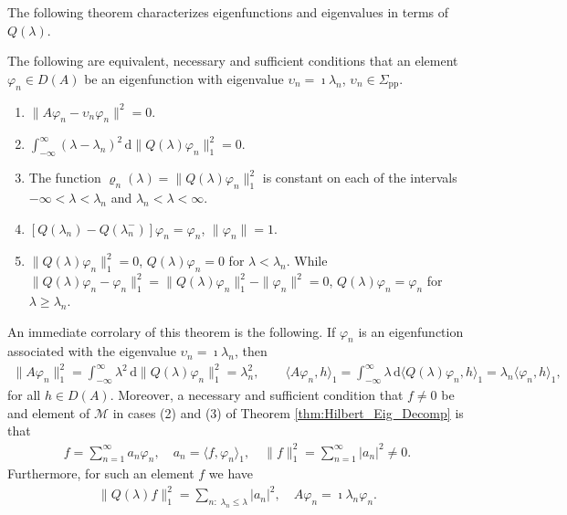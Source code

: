 \documentclass[leqno,onefignum,onetabnum]{siamltex1213}
\renewcommand{\d}{\mathrm{d}}
\newcommand{\Sigp}{\Sigma_{\text{pp}}}
\newcommand{\Mc}{\mathcal{M}}
\begin{document}
The following theorem characterizes eigenfunctions and eigenvalues in
terms of $Q(\lambda)$.
%
\begin{theorem}\label{thm:Eig_fun_val}
The following are equivalent, necessary and sufficient conditions that
an element $\varphi_n\in D(A)$ be an eigenfunction with eigenvalue $\upsilon_n=\imath\lambda_n$,
$\upsilon_n\in\Sigp$. 
%
\begin{enumerate}
\item $\|A\varphi_n-\upsilon_n\varphi_n\|^2=0$.
\item $\int_{-\infty}^\infty(\lambda-\lambda_n)^2\,\d\|Q(\lambda)\varphi_n\|_1^2=0$.
\item The function $\varrho_n(\lambda)=\|Q(\lambda)\varphi_n\|_1^2$ is constant on each of the
  intervals $-\infty<\lambda<\lambda_n$ and $\lambda_n<\lambda<\infty$.
\item $[Q(\lambda_n)-Q(\lambda_n^-)]\varphi_n=\varphi_n$, $\|\varphi_n\|=1$.
\item $\|Q(\lambda)\varphi_n\|_1^2=0$, $Q(\lambda)\varphi_n=0$ for $\lambda<\lambda_n$. While
      $\|Q(\lambda)\varphi_n-\varphi_n\|_1^2=\|Q(\lambda)\varphi_n\|_1^2-\|\varphi_n\|^2=0$, $Q(\lambda)\varphi_n=\varphi_n$ for $\lambda\geq\lambda_n$. 
\end{enumerate}
%
\end{theorem}
%
\noindent
An immediate corrolary of this theorem is the following. If $\varphi_n$ is
an eigenfunction associated with the eigenvalue $\upsilon_n=\imath\lambda_n$, then
\cite{Stone:64}   
%
\begin{align}
  \|A\varphi_n\|_1^2=\int_{-\infty}^\infty\lambda^2\,\d\|Q(\lambda)\varphi_n\|_1^2=\lambda_n^2, \qquad
  \langle A\varphi_n,h\rangle_1=\int_{-\infty}^\infty\lambda\,\d\langle Q(\lambda)\varphi_n,h\rangle_1=\lambda_n\langle\varphi_n,h\rangle_1,
\end{align}
%
for all $h\in D(A)$. Moreover, a necessary and sufficient condition that
$f\neq0$ be and element of $\Mc$ in cases (2) and (3) of Theorem
\ref{thm:Hilbert_Eig_Decomp} is that
%
\begin{align}\label{eq:Eig_Fun_Expansion}
  f=\sum_{n=1}^\infty a_n\varphi_n, \quad
  a_n=\langle f,\varphi_n\rangle_1, \quad
  \|f\|_1^2=\sum_{n=1}^\infty|a_n|^2\neq0.
\end{align}
%
Furthermore, for such an element $f$ we have
%
\begin{align}
  \|Q(\lambda)f\|_1^2=\sum_{n:\;\lambda_n\leq\lambda}|a_n|^2, \quad
  A\varphi_n=\imath\lambda_n\varphi_n.
\end{align}
%
\end{document}
